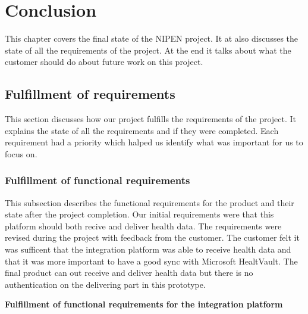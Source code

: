\chapter{Conclusion}
\label{ch:conclusion}

This chapter covers the final state of the NIPEN project.
It at also discusses the state of all the requirements of the project.
At the end it talks about what the customer should do about future work on this project.


\section{Fulfillment of requirements}

This section discusses how our project fulfills the requirements of the project. 
It explains the state of all the requirements and if they were completed. Each requirement had a priority which halped us identify what was important for us to focus on.

\subsection{Fulfillment of functional requirements}

This subsection describes the functional requirements for the product and their state after the project completion.
Our initial requirements were that this platform should both recive and deliver health data. 
The requirements were revised during the project with feedback from the customer.
The customer felt it was sufficent that the integration platform was able to receive health data and that it was more important to have a good sync with Microsoft HealtVault. 
The final product can out receive and deliver health data but there is no authentication on the delivering part in this prototype. 

\textbf{Fulfillment of functional requirements for the integration platform}

